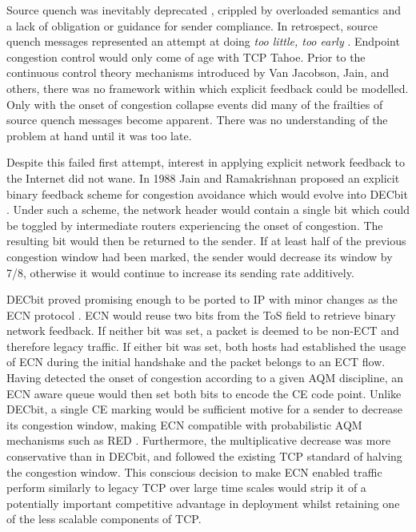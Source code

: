 Source quench was inevitably deprecated \cite{Baker:1995p479}, crippled by overloaded semantics and a lack of obligation or guidance for sender compliance.
In retrospect, source quench messages represented an attempt at doing \emph{too little, too early} \cite{Crowcroft:2003p450}.
Endpoint congestion control would only come of age with \ac{TCP} Tahoe.
Prior to the continuous control theory mechanisms introduced by Van Jacobson, Jain, and others, there was no framework within which explicit feedback could be modelled.
Only with the onset of congestion collapse events did many of the frailties of source quench messages become apparent.
There was no understanding of the problem at hand until it was too late.

Despite this failed first attempt, interest in applying explicit network feedback to the Internet did not wane.
In 1988 Jain and Ramakrishnan proposed an explicit binary feedback scheme for congestion avoidance which would evolve into DECbit \cite{Ramakrishnan:1990p456}.
Under such a scheme, the network header would contain a single bit which could be toggled by intermediate routers experiencing the onset of congestion.
The resulting bit would then be returned to the sender.
If at least half of the previous congestion window had been marked, the sender would decrease its window by 7/8, otherwise it would continue to increase its sending rate additively.

DECbit proved promising enough to be ported to \ac{IP} with minor changes as the \ac{ECN} protocol \cite{Floyd:1994p491}.
\ac{ECN} would reuse two bits from the \ac{ToS} field to retrieve binary network feedback.
If neither bit was set, a packet is deemed to be non-\ac{ECT} and therefore legacy traffic.
If either bit was set, both hosts had established the usage of \ac{ECN} during the initial handshake and the packet belongs to an \ac{ECT} flow.
Having detected the onset of congestion according to a given \ac{AQM} discipline, an \ac{ECN} aware queue would then set both bits to encode the \ac{CE} code point.
Unlike DECbit, a single \ac{CE} marking would be sufficient motive for a sender to decrease its congestion window, making \ac{ECN} compatible with probabilistic \ac{AQM} mechanisms such as \ac{RED} \cite{Floyd:1993p492}.
Furthermore, the multiplicative decrease was more conservative than in DECbit, and followed the existing \ac{TCP} standard of halving the congestion window.
This conscious decision to make \ac{ECN} enabled traffic perform similarly to legacy \ac{TCP} over large time scales would strip it of a potentially important competitive advantage in deployment whilst retaining one of the less scalable components of \ac{TCP}.

